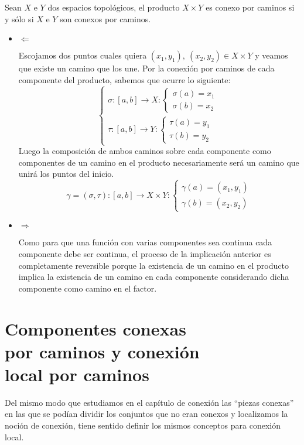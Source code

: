 \begin{prop}
Sean $X$ e $Y$ dos espacios topológicos, el producto $X\times Y$ es conexo por caminos si y sólo si $X$ e $Y$ son conexos por caminos.
\end{prop}
\begin{demo}
\begin{itemize}
\item $\Leftarrow$

Escojamos dos puntos cuales quiera $\left( x_1, y_1 \right),\ \left( x_2, y_2 \right) \in X \times Y$ y veamos que existe un camino que los une. Por la conexión por caminos de cada componente del producto, sabemos que ocurre lo siguiente: 
\[
\begin{cases}
    \sigma: \left[ a, b \right] \rightarrow X: \begin{cases}
        \sigma\left( a \right) = x_1 \\
        \sigma\left( b \right) = x_2
    \end{cases} \\
    \tau: \left[ a, b \right] \rightarrow Y: \begin{cases}
        \tau\left( a \right) = y_1 \\
        \tau\left( b \right) = y_2
    \end{cases}
\end{cases} 
\]
Luego la composición de ambos caminos sobre cada componente como componentes de un camino en el producto necesariamente será un camino que unirá los puntos del inicio.
\[
\gamma = \left( \sigma, \tau \right) : \left[ a, b \right] \rightarrow X \times Y: \begin{cases}
        \gamma\left( a \right) = \left( x_1, y_1 \right)\\
        \gamma\left( b \right) = \left( x_2, y_2 \right)
    \end{cases}  
\]

\item $\Rightarrow$

Como para que una función con varias componentes sea continua cada componente debe ser continua, el proceso de la implicación anterior es completamente reversible porque la existencia de un camino en el producto implica la existencia de un camino en cada componente considerando dicha componente como camino en el factor.
\end{itemize}
\end{demo}


\chapter{Componentes conexas\texorpdfstring{\\}{} por caminos y conexión\texorpdfstring{\\}{} local por caminos}%
\label{cha:componentes_conexas_por_caminos_y_conexion_local_por_caminos}
Del mismo modo que estudiamos en el capítulo de conexión las ``piezas conexas'' en las que se podían dividir los conjuntos que no eran conexos y localizamos la noción de conexión, tiene sentido definir los mismos conceptos para conexión local.

